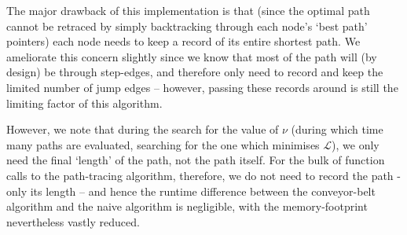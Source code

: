 \documentclass[fleqn,usenatbib]{mnras}
\begin{document}
				The major drawback of this implementation is that (since the optimal path cannot be retraced by simply backtracking through each node's `best path' pointers) each node needs to keep a record of its entire shortest path. We ameliorate this concern slightly since we know that most of the path will (by design) be through step-edges, and therefore only need to record and keep the limited number of jump edges -- however, passing these records around is still the limiting factor of this algorithm. 

				However, we note that during the search for the value of $\nu$ (during which time many paths are evaluated, searching for the one which minimises $\mathcal{L}$), we only need the final `length' of the path, not the path itself. For the bulk of function calls to the path-tracing algorithm, therefore, we do not need to record the path - only its length -- and hence the runtime difference between the conveyor-belt algorithm and the naive algorithm is negligible, with the memory-footprint nevertheless vastly reduced.
\end{document}
